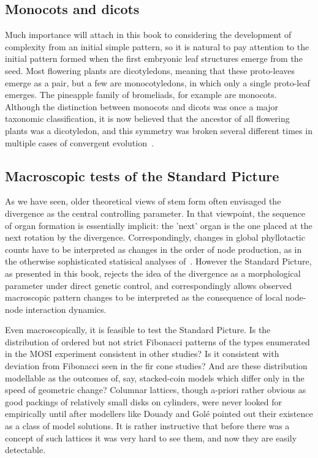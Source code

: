 \subsection{Monocots and dicots}
Much importance will attach in this book to considering the development of complexity from an initial simple pattern, so it is natural to pay attention to the initial pattern formed when the first embryonic leaf structures emerge from the seed. Most flowering plants are dicotyledons, meaning that these proto-leaves emerge as a pair, but a few are monocotyledons, in which 
only a single proto-leaf emerges. The pineapple family of bromeliads, for example are monocots. Although the distinction between monocots and dicots was once a major taxonomic classification, it is now believed that the ancestor of all flowering plants was a dicotyledon, and this symmetry was broken several different times in multiple cases of convergent evolution~\cite{ingrouillePlantsDiversityEvolution2006}. 
 
\subsection{Macroscopic tests of the Standard Picture}
As we have seen, older theoretical views of stem form often envisaged the divergence as the central controlling parameter. In that viewpoint, the sequence of organ formation is essentially implicit: the 'next' organ is the one placed at the next rotation by the divergence. Correspondingly, changes in global phyllotactic counts have to be interpreted as changes in the order of node production, as in the otherwise  sophisticated statisical analyses of~\cite{guedonPatternIdentificationCharacterization2013}. However the Standard Picture, as presented in this book, rejects the idea of the divergence as a morphological parameter under direct genetic control, and correspondingly allows observed macroscopic pattern changes to be interpreted as the consequence of local node-node interaction dynamics. 

Even macroscopically, it is feasible to test the Standard Picture. Is the distribution of ordered but not strict Fibonacci patterns of the types enumerated in the MOSI experiment consistent in other studies? Is it consistent with deviation from Fibonacci seen in the fir cone studies? And are these distribution modellable as the outcomes of, say, stacked-coin models which differ only in the speed of geometric change? 
Columnar lattices, though a-priori rather obvious as good packings of relatively small disks on cylinders, were never looked for empirically until after modellers like Douady and Golé pointed out their existence as a class of model solutions. It is rather instructive that before there was a concept of such lattices it was very hard to see them, and now they are easily detectable. 


